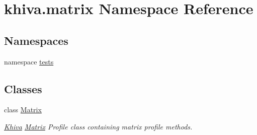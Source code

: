 \hypertarget{namespacekhiva_1_1matrix}{}\section{khiva.\+matrix Namespace Reference}
\label{namespacekhiva_1_1matrix}
\subsection*{Namespaces}
\begin{DoxyCompactItemize}
\item 
namespace \mbox{\hyperlink{namespacekhiva_1_1matrix_1_1tests}{tests}}
\end{DoxyCompactItemize}
\subsection*{Classes}
\begin{DoxyCompactItemize}
\item 
class \mbox{\hyperlink{classkhiva_1_1matrix_1_1_matrix}{Matrix}}
\begin{DoxyCompactList}\small\item\em \mbox{\hyperlink{classkhiva_1_1_khiva}{Khiva}} \mbox{\hyperlink{classkhiva_1_1matrix_1_1_matrix}{Matrix}} Profile class containing matrix profile methods. \end{DoxyCompactList}\end{DoxyCompactItemize}
